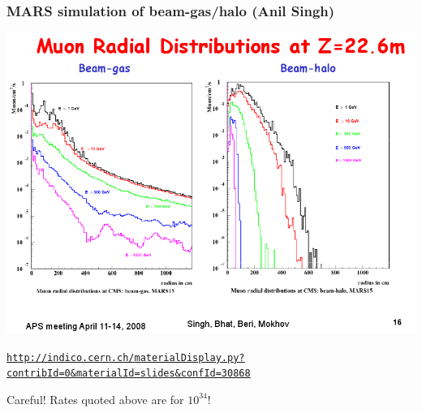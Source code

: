 \documentclass[compress]{beamer}
\begin{document}


\begin{frame}
\frametitle{MARS simulation of beam-gas/halo (Anil Singh)}
\includegraphics[width=\linewidth]{slide.png}

\tiny
\textcolor{blue}{\tt \underline{\href{http://indico.cern.ch/materialDisplay.py?contribId=0&materialId=slides&confId=30868}{http://indico.cern.ch/materialDisplay.py?contribId=0\&materialId=slides\&confId=30868}}}

Careful! Rates quoted above are for $10^{34}$!
\end{frame}

\end{document}
